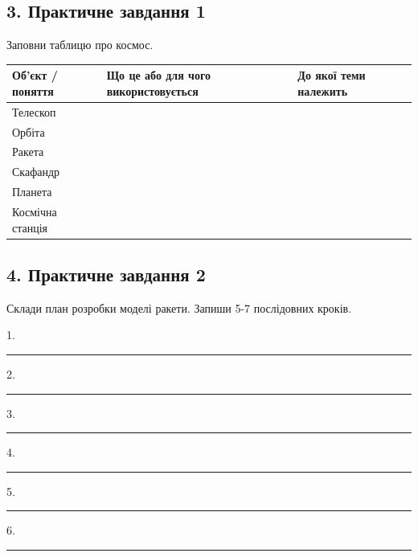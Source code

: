 \documentclass[11pt,a4paper]{article}
\begin{document}
\subsection*{3. Практичне завдання 1}

Заповни таблицю про космос.\par

\begin{tabularx}{\linewidth}{|>{\raggedright\arraybackslash}X|>{\raggedright\arraybackslash}X|>{\raggedright\arraybackslash}X|}\hline

\textbf{Об'єкт / поняття} & \textbf{Що це або для чого використовується} & \textbf{До якої теми належить} \\ \hline

Телескоп &  &  \\ \hline

Орбіта &  &  \\ \hline

Ракета &  &  \\ \hline

Скафандр &  &  \\ \hline

Планета &  &  \\ \hline

Космічна станція &  &  \\ \hline

\end{tabularx}\par

\subsection*{4. Практичне завдання 2}

Склади план розробки моделі ракети. Запиши 5-7 послідовних кроків.\par

1. \rule{0.65\linewidth}{0.4pt}\par

2. \rule{0.65\linewidth}{0.4pt}\par

3. \rule{0.65\linewidth}{0.4pt}\par

4. \rule{0.65\linewidth}{0.4pt}\par

5. \rule{0.65\linewidth}{0.4pt}\par

6. \rule{0.65\linewidth}{0.4pt}\par
\end{document}
